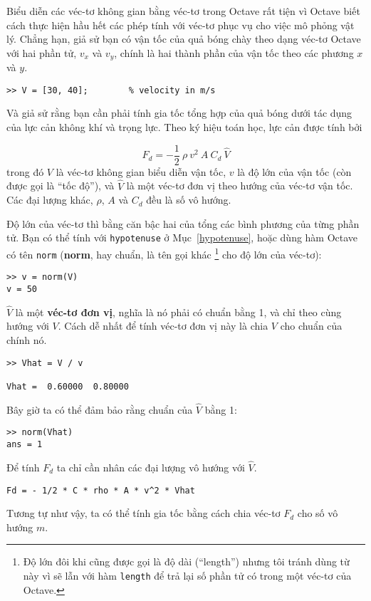 \documentclass[12pt]{book}
\begin{document}
Biểu diễn các véc-tơ không gian bằng véc-tơ trong Octave rất tiện vì 
Octave biết cách thực hiện hầu hết các phép tính với véc-tơ phục vụ 
cho việc mô phỏng vật lý. Chẳng hạn, giả sử bạn có vận tốc của quả 
bóng chày theo dạng véc-tơ Octave với hai phần tử, $v_x$ và $v_y$,
chính là hai thành phần của vận tốc theo các phương $x$ và  $y$.

\begin{verbatim}
>> V = [30, 40];        % velocity in m/s
\end{verbatim}
%
Và giả sử rằng bạn cần phải tính gia tốc tổng hợp của quả bóng dưới tác 
dụng của lực cản không khí và trọng lực. Theo ký hiệu toán học, lực cản 
được tính bởi 

\[ F_d = -\frac{1}{2} ~ \rho ~ v^2 ~ A ~ C_d ~ \hat{V}   \]
%
trong đó  $V$ là véc-tơ không gian biểu diễn vận tốc, $v$ là độ lớn của 
vận tốc (còn được gọi là  ``tốc độ''), và $\hat{V}$ là một véc-tơ đơn vị 
theo hướng của véc-tơ vận tốc. Các đại lượng khác, $\rho$, $A$ và  $C_d$
đều là số vô hướng.

Độ lớn của véc-tơ thì bằng căn bậc hai của tổng các bình phương 
của từng phần tử. Bạn có thể tính với {\tt hypotenuse} ở Mục~\ref{hypotenuse}, 
hoặc dùng hàm Octave có tên {\tt norm} ({\bf norm}, hay chuẩn, là 
tên gọi khác \footnote{Độ lớn đôi khi cũng được gọi là độ dài 
(``length'') nhưng tôi tránh dùng từ này vì sẽ lẫn với hàm 
{\tt length} để trả lại số phần tử có trong một véc-tơ của Octave.}  
cho độ lớn của véc-tơ):

\begin{verbatim}
>> v = norm(V)
v = 50
\end{verbatim}
%
$\hat{V}$ là một {\bf véc-tơ đơn vị}, nghĩa là nó phải có chuẩn bằng 1,
và  chỉ theo cùng hướng với $V$.  Cách dễ nhất để tính véc-tơ đơn vị này là chia 
$V$ cho chuẩn của chính nó.

\begin{verbatim}
>> Vhat = V / v

Vhat =  0.60000  0.80000
\end{verbatim}
%
Bây giờ ta có thể đảm bảo rằng chuẩn của $\hat{V}$ bằng 1:

\begin{verbatim}
>> norm(Vhat)
ans = 1
\end{verbatim}
%
Để tính $F_d$ ta chỉ cần nhân các đại lượng vô hướng với $\hat{V}$.

\begin{verbatim}
Fd = - 1/2 * C * rho * A * v^2 * Vhat
\end{verbatim}
%
Tương tự như vậy, ta có thể tính gia tốc bằng cách chia véc-tơ 
$F_d$ cho số vô hướng $m$.
\end{document}
